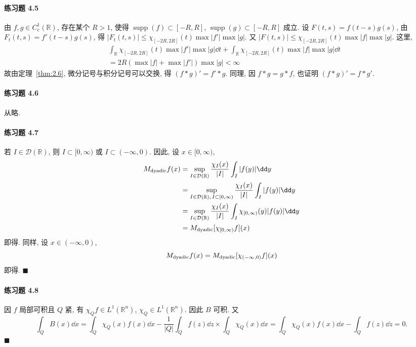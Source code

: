 \paragraph*{练习题 4.5}
由 $f, g \in C_{\mathrm{c}}^{1}(\mathbb{R})$, 存在某个 $R > 1$, 使得 $\operatorname{supp}(f) \subset [-R, R]$, $\operatorname{supp}(g) \subset [-R, R]$ 成立. 设 $F(t, s) = f(t-s)g(s)$, 由 $F_{t}(t, s) = f'(t-s)g(s)$, 得 $|F_{t}(t, s)| \leq \chi_{[-2R,2R]}(t)\max|f'|\max|g|$. 又 $|F(t, s)| \leq \chi_{[-2R,2R]}(t)\max|f|\max|g|$. 这里,
\begin{align*}
&\int_{\mathbb{R}}\chi_{[-2R,2R]}(t)\max|f'|\max|g|\dd t + \int_{\mathbb{R}}\chi_{[-2R,2R]}(t)\max|f|\max|g|\dd t \\
&= 2R(\max|f| + \max|f'|)\max|g| < \infty
\end{align*}
故由定理~\ref{thm:2.6}, 微分记号与积分记号可以交换, 得 $(f*g)' = f'*g$. 同理, 因 $f*g = g*f$, 也证明 $(f*g)' = f*g'$.

\paragraph*{练习题 4.6}
从略.

\paragraph*{练习题 4.7}
若 $I \in \mathcal{D}(\mathbb{R})$, 则 $I \subset [0, \infty)$ 或 $I \subset (-\infty, 0)$. 因此, 设 $x \in [0, \infty)$,
\begin{align*}
M_{\dyadic}f(x) &= \sup_{I \in \mathcal{D}(\mathbb{R})}\frac{\chi_{I}(x)}{|I|}\int_{I}|f(y)|\dd y \\
&= \sup_{I \in \mathcal{D}(\mathbb{R}),\, I \subset [0, \infty)}\frac{\chi_{I}(x)}{|I|}\int_{I}|f(y)|\dd y \\
&= \sup_{I \in \mathcal{D}(\mathbb{R})}\frac{\chi_{I}(x)}{|I|}\int_{I}\chi_{[0, \infty)}(y)|f(y)|\dd y \\
&= M_{\dyadic}[\chi_{[0, \infty)}f](x)
\end{align*}
即得. 同样, 设 $x \in (-\infty, 0)$,
\[
M_{\mathrm{dyadic}}f(x) = M_{\mathrm{dyadic}}[\chi_{(-\infty, 0)}f](x)
\]
即得. $\blacksquare$

\paragraph*{练习题 4.8}
因 $f$ 局部可积且 $Q$ 紧, 有 $\chi_{Q}f \in L^{1}(\mathbb{R}^{n})$, $\chi_{Q} \in L^{1}(\mathbb{R}^{n})$. 因此 $B$ 可积. 又
\[
\int_{Q}B(x)\dd x = \int_{Q}\chi_{Q}(x)f(x)\dd x - \frac{1}{|Q|}\int_{Q}f(z)\dd z \times \int_{Q}\chi_{Q}(x)\dd x = \int_{Q}\chi_{Q}(x)f(x)\dd x - \int_{Q}f(z)\dd z = 0.
\]
$\blacksquare$

